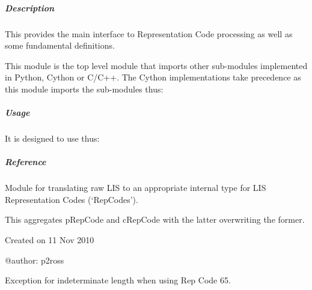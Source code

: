 \documentclass[letterpaper,10pt,english]{sphinxmanual}
\begin{document}
\subparagraph{Description}
\label{\detokenize{ref/LIS/core/RepCode:description}}
This provides the main interface to Representation Code processing as well as some fundamental definitions.

This module is the top level module that imports other sub-modules implemented in Python, Cython or C/C++. The Cython implementations take precedence as this module imports the sub-modules thus:

\begin{sphinxVerbatim}[commandchars=\\\{\}]
   
   
\end{sphinxVerbatim}


\subparagraph{Usage}
\label{\detokenize{ref/LIS/core/RepCode:usage}}
It is designed to use thus:

\begin{sphinxVerbatim}[commandchars=\\\{\}]
   
\end{sphinxVerbatim}


\subparagraph{Reference}
\label{\detokenize{ref/LIS/core/RepCode:module-TotalDepth.LIS.core.RepCode}}\label{\detokenize{ref/LIS/core/RepCode:reference}}
Module for translating raw LIS to an appropriate internal type for LIS
Representation Codes (‘RepCodes’).

This aggregates pRepCode and cRepCode with the latter overwriting the former.

Created on 11 Nov 2010

@author: p2ross

\begin{fulllineitems}
\label{\detokenize{ref/LIS/core/RepCode:TotalDepth.LIS.core.RepCode.ExceptionRepCodeNoLength}}
Exception for indeterminate length when using Rep Code 65.

\end{fulllineitems}
\end{document}
